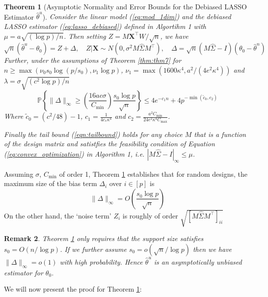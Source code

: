 \documentclass{article}
\newtheorem{theorem}{Theorem}
\newtheorem{remark}[theorem]{Remark}
\begin{document}
\begin{theorem}[Asymptotic Normality and Error Bounds for the Debiased LASSO Estimator $\hat{\theta}^u$] 
    \label{thm:thm8}
    Consider the linear model (\ref{eq:mod_1dim}) and the debiased LASSO estimator (\ref{eq:lasso_debiased}) defined in Algortihm 1 with $\mu = a \sqrt{(\log p)/n}$. Then setting $Z = M\mathbf{X}^\top W/\sqrt{n}$, we have 
    \begin{equation}
        \sqrt{n}(\hat{\theta}^u - \theta_0) = Z + \Delta, \quad Z|\mathbf{X} \sim N(0, \sigma^2M \hat{\Sigma}M^\top), \quad \Delta = \sqrt{n}(M\hat{\Sigma}- I)(\theta_0 - \hat{\theta}^n)
    \end{equation}
    Further, under the assumptions of Theorem \ref{thm:thm7} for $n \ge \max(\nu_0s_0 \log(p/s_0), \nu_1 \log p)$, $\nu_1= \max(1600 \kappa^4, a^2/(4e^2\kappa^4))$ and $\lambda = \sigma \sqrt{(c^2 \log p)/n}$ 
    \begin{equation}
    \label{eqn:tailbound}
    \mathbb{P}\left\{\|\Delta\|_\infty \ge \left(\frac{16ac \sigma}{C_{\min}} \right)\frac{s_0 \log p}{\sqrt{n}}\right\} \le 4e^{-c_1n} + 4p^{-\min(\tilde{c}_0, c_2)}
    \end{equation}
    Where $\tilde{c}_0 = (c^2/48)-1$, $c_1 = \frac{1}{4c_* \kappa^4}$ and $c_2 = \frac{a^2 C_{\min}}{24 e^2 \kappa^4 C_{\max}}$. 
    \noindent
    
    Finally the tail bound (\ref{eqn:tailbound}) holds for any choice $M$ that is a function of the design matrix and satistfies the feasibility condition of Equation (\ref{eq:convex_optimization}) in Algorithm 1, i.e. $|M\hat{\Sigma}- I|_\infty \le \mu$.
\end{theorem}
Assuming $\sigma$, $C_{\min}$ of order 1, Theorem \ref{thm:thm8} establishes that for random designs, the  maximum size of the bias term $\Delta_i$ over $i \in [p]$ is 
\begin{equation}
\|\Delta\|_{\infty} = O\left(\frac{s_0\log p}{\sqrt{n}}\right)
\end{equation}
On the other hand, the `noise term' $Z_i$ is roughly of order $\sqrt{[M \hat{\Sigma}M^\top]_{ii}}$
\begin{remark}
    Theorem \ref{thm:thm8} only requires that the support size satisfies $s_0 = O(n/\log p)$. If we further assume $s_0 = o(\sqrt{n}/\log p)$ then we have $\|\Delta\|_\infty = o(1)$ with high probability. Hence $\hat{\theta}^u$ is an asymptotically unbiased estimator for $\theta_0$.
\end{remark}
\noindent
We will now present the proof for Theorem \ref{thm:thm8}:
\end{document}
